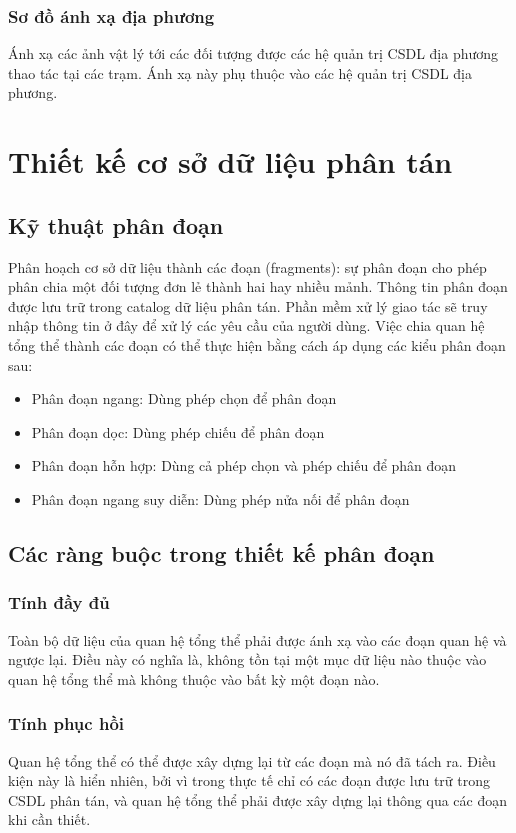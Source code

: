 \documentclass[12pt,a4paper]{report}
\begin{document}
\subsubsection{Sơ đồ ánh xạ địa phương}
Ánh xạ các ảnh vật lý tới các đối tượng được các hệ quản trị CSDL địa phương thao tác tại các trạm. Ánh xạ này phụ thuộc vào các hệ quản trị CSDL địa phương.
\section{Thiết kế cơ sở dữ liệu phân tán}
\subsection{Kỹ thuật phân đoạn}
Phân hoạch cơ sở dữ liệu thành các đoạn (fragments): sự phân đoạn cho phép phân chia một đối tượng đơn lẻ thành hai hay nhiều mảnh. Thông tin phân đoạn được lưu trữ trong catalog dữ liệu phân tán. Phần mềm xử lý giao tác sẽ truy nhập thông tin ở đây để xử lý các yêu cầu của người dùng. Việc chia quan hệ tổng thể thành các đoạn có thể thực hiện bằng cách áp dụng các kiểu phân đoạn sau: 
\begin{itemize}
	\item Phân đoạn ngang: Dùng phép chọn để phân đoạn
	\item Phân đoạn dọc: Dùng phép chiếu để phân đoạn
	\item Phân đoạn hỗn hợp: Dùng cả phép chọn và phép chiếu để phân đoạn 
	\item Phân đoạn ngang suy diễn: Dùng phép nửa nối để phân đoạn
\end{itemize}
\subsection{Các ràng buộc trong thiết kế phân đoạn}
\subsubsection{Tính đầy đủ}
Toàn bộ dữ liệu của quan hệ tổng thể phải được ánh xạ vào các đoạn quan hệ và ngược lại. Điều này có nghĩa là, không tồn tại một mục dữ liệu nào thuộc vào quan hệ tổng thể mà không thuộc vào bất kỳ một đoạn nào. 
\subsubsection{Tính phục hồi}
Quan hệ tổng thể có thể được xây dựng lại từ các đoạn mà nó đã tách ra. Điều kiện này là hiển nhiên, bởi vì trong thực tế chỉ có các đoạn được lưu trữ trong CSDL phân tán, và quan hệ tổng thể phải được xây dựng lại thông qua các đoạn khi cần thiết.
\end{document}
